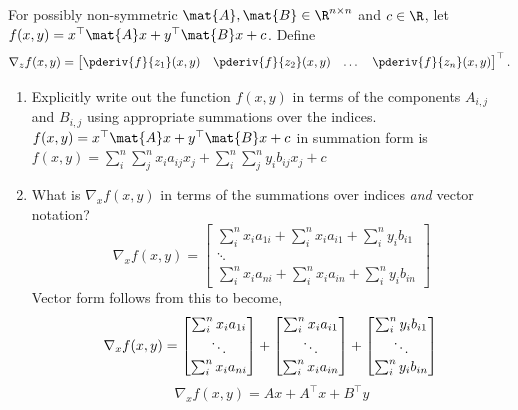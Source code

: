 \documentclass{article}
\begin{document}
\newpage
\begin{aprob} \label{prob:sumvec}
    For possibly non-symmetric $\mat{A}, \mat{B} \in \R^{n \times n}$ and $c \in \R$, let $f(x, y) = x^\top \mat{A} x + y^\top \mat{B} x + c$. Define
    $$\nabla_z f(x,y) = \begin{bmatrix}
        \pderiv{f}{z_1}(x,y) & \pderiv{f}{z_2}(x,y) & \dots & \pderiv{f}{z_n}(x,y)
    \end{bmatrix}^\top.$$
    \begin{enumerate}
        \item {} Explicitly write out the function $f(x, y)$ in terms of the components $A_{i,j}$ and $B_{i,j}$ using appropriate summations over the indices.\\
    	$f(x, y) = x^\top \mat{A} x + y^\top \mat{B} x + c$ in summation form is $ \boxed{f(x, y) = \sum_i^n \sum_j^n x_i a_{ij} x_j + \sum_i^n \sum_j^n y_i b_{ij} x_j +c} $
    	\newpage
        \item {} What is $\nabla_x f(x,y)$ in terms of the summations over indices \emph{and} vector notation?\\
            $$ \nabla_x f(x, y) = \begin{bmatrix} \sum_i^n x_i a_{1i} + \sum_i^n x_i a_{i1} + \sum_i^n y_i b_{i1}  \\ \ddots \\ \sum_i^n x_i a_{ni} + \sum_i^n x_i a_{in} + \sum_i^n y_i b_{in} \end{bmatrix}$$
        Vector form follows from this to become,
        \begin{equation*}
            \nabla_x f(x, y) = \begin{bmatrix} \sum_i^n x_i a_{1i} \\ \ddots \\ \sum_i^n x_i a_{ni} \end{bmatrix} + \begin{bmatrix} \sum_i^n x_i a_{i1}   \\ \ddots \\ \sum_i^n x_i a_{in} \end{bmatrix} + \begin{bmatrix} \sum_i^n y_i b_{i1} \\ \ddots \\ \sum_i^n y_i b_{in} \end{bmatrix} \\
        \end{equation*}
        \begin{equation*}
            \boxed{ \nabla_x f(x, y) = Ax + A^\top x + B^\top y }

\end{equation*}
\end{enumerate}
\end{aprob}
\end{document}
